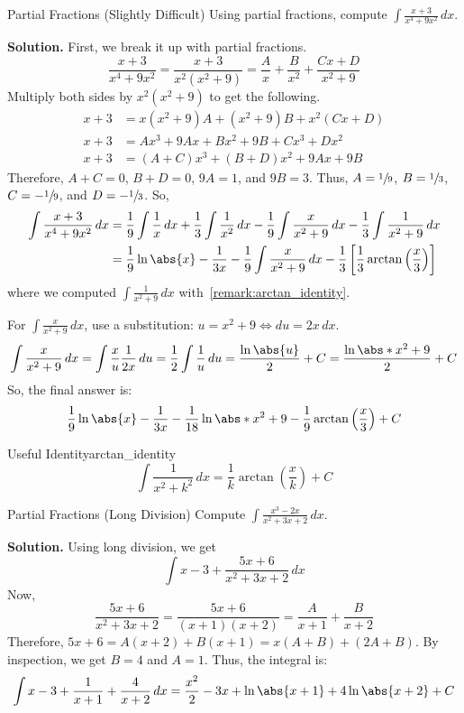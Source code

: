 \begin{Example}{Partial Fractions (Slightly Difficult)}{}
    Using partial fractions, compute $ \displaystyle \int \frac{x+3}{x^4+9x^2} \, d{x} $.

    \textbf{Solution.}
    First, we break it up with partial fractions.
    \[ \frac{x+3}{x^4+9x^2} =\frac{x+3}{x^2(x^2+9)}=\frac{A}{x}+\frac{B}{x^2} +\frac{Cx+D}{x^2+9}  \]
    Multiply both sides by $ x^2(x^2+9) $ to get the following.
    \begin{align*}
        x+3 & =x(x^2+9)A+(x^2+9)B+x^2(Cx+D) \\
        x+3 & =Ax^3+9Ax+Bx^2+9B+Cx^3+Dx^2   \\
        x+3 & =(A+C)x^3+(B+D)x^2+9Ax+9B
    \end{align*}
    Therefore, $ A+C=0 $, $ B+D=0 $, $ 9A=1 $, and $ 9B=3 $. Thus,
    $ A=\sfrac{1}{9} $, $ B=\sfrac{1}{3} $, $ C=-\sfrac{1}{9} $,
    and $ D=-\sfrac{1}{3} $. So,
    \begin{align*}
        \int \frac{x+3}{x^4+9x^2} \, d{x}
         & =\frac{1}{9} \int \frac{1}{x} \, d{x} +\frac{1}{3} \int \frac{1}{x^2} \, d{x}
        -\frac{1}{9} \int \frac{x}{x^2+9} \, d{x} -\frac{1}{3} \int \frac{1}{x^2+9} \, d{x} \\
         & =\frac{1}{9}\ln\abs{x}-\frac{1}{3x}-\frac{1}{9} \int \frac{x}{x^2+9}\, d{x}
        -\frac{1}{3} \left[ \frac{1}{3}\arctan\left( \frac{x}{3}  \right) \right]           \\
    \end{align*}
    where we computed $ \displaystyle \int \frac{1}{x^2+9}\,d{x} $ with~\ref{remark:arctan_identity}.

    For $ \displaystyle \int \frac{x}{x^2+9} \, d{x}  $, use a substitution: $ u=x^2+9\iff du=2x\,dx $.
    \[
        \int \frac{x}{x^2+9} \, d{x}
        =\int \frac{x}{u} \frac{1}{2x} \, d{u}
        =\frac{1}{2} \int \frac{1}{u} \, d{u}
        =\frac{\ln\abs{u}}{2} +C
        =\frac{\ln\abs*{x^2+9}}{2} +C
    \]
    So, the final answer is:
    \[ \frac{1}{9}\ln\abs{x}-\frac{1}{3x}-\frac{1}{18}\ln\abs*{x^2+9}
        -\frac{1}{9} \arctan\left( \frac{x}{3}  \right)+C \]
\end{Example}

\begin{Remark}{Useful Identity}{arctan_identity}
    \[ \int \frac{1}{x^2+k^2} \, d{x}=\frac{1}{k} \arctan\left( \frac{x}{k}  \right)+C  \]
\end{Remark}

\begin{Example}{Partial Fractions (Long Division)}{}
    Compute $ \displaystyle \int \frac{x^3-2x}{x^2+3x+2} \, d{x} $.

    \textbf{Solution.}
    Using long division, we get
    \[ \int x-3+\frac{5x+6}{x^2+3x+2} \, d{x}  \]
    Now,
    \[ \frac{5x+6}{x^2+3x+2} =\frac{5x+6}{(x+1)(x+2)} =\frac{A}{x+1} +\frac{B}{x+2} \]
    Therefore, $ 5x+6=A(x+2)+B(x+1) = x(A+B)+(2A+B)$. By inspection,
    we get $ B=4 $ and $ A=1 $. Thus, the integral is:
    \[ \int x-3+\frac{1}{x+1} +\frac{4}{x+2} \, d{x} =\frac{x^2}{2} -3x+\ln\abs{x+1}
        +4\ln\abs{x+2}+C \]
\end{Example}
